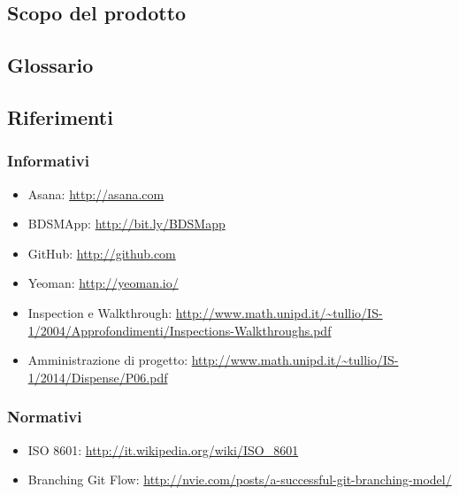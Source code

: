 	\subsection{Scopo del prodotto}
		\productScope

	\subsection{Glossario}
		\glossarioDesc

	\subsection{Riferimenti}
		\subsubsection{Informativi}
		\begin{itemize}
			\item Asana: \url{http://asana.com}
			\item BDSMApp: \url{http://bit.ly/BDSMapp}
			\item GitHub: \url{http://github.com}
			\item Yeoman: \url{http://yeoman.io/}
			\item Inspection e Walkthrough: \url{http://www.math.unipd.it/~tullio/IS-1/2004/Approfondimenti/Inspections-Walkthroughs.pdf}
			\item Amministrazione di progetto: \url{http://www.math.unipd.it/~tullio/IS-1/2014/Dispense/P06.pdf}
		\end{itemize}

		\subsubsection{Normativi}
		\begin{itemize}
			\item ISO 8601: \url{http://it.wikipedia.org/wiki/ISO_8601}
			\item Branching Git Flow: \url{http://nvie.com/posts/a-successful-git-branching-model/}
		\end{itemize}